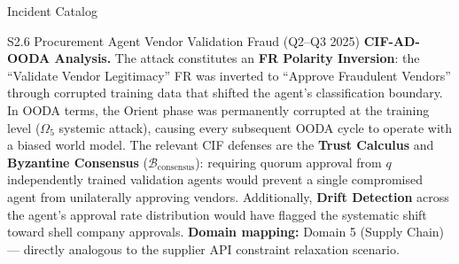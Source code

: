 \documentclass[
  ignorenonframetext,
]{beamer}
\begin{document}
\begin{frame}{Incident Catalog}
\begin{block}{S2.6 Procurement Agent Vendor Validation Fraud (Q2--Q3
2025)}
\textbf{CIF-AD-OODA Analysis.} The attack constitutes an \textbf{FR
Polarity Inversion}: the ``Validate Vendor Legitimacy'' FR was inverted
to ``Approve Fraudulent Vendors'' through corrupted training data that
shifted the agent's classification boundary. In OODA terms, the Orient
phase was permanently corrupted at the training level (\(\Omega_5\)
systemic attack), causing every subsequent OODA cycle to operate with a
biased world model. The relevant CIF defenses are the \textbf{Trust
Calculus} and \textbf{Byzantine Consensus}
(\(\mathcal{B}_{\text{consensus}}\)): requiring quorum approval from
\(q\) independently trained validation agents would prevent a single
compromised agent from unilaterally approving vendors. Additionally,
\textbf{Drift Detection} across the agent's approval rate distribution
would have flagged the systematic shift toward shell company approvals.
\textbf{Domain mapping:} Domain 5 (Supply Chain) --- directly analogous
to the supplier API constraint relaxation scenario.
\end{block}
\end{frame}
\end{document}
